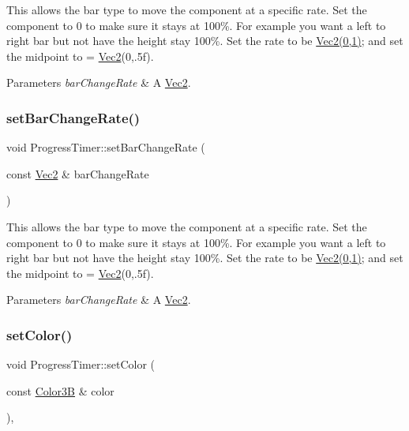 This allows the bar type to move the component at a specific rate. Set the component to 0 to make sure it stays at 100\%. For example you want a left to right bar but not have the height stay 100\%. Set the rate to be \hyperlink{classVec2}{Vec2(0,1)}; and set the midpoint to = \hyperlink{classVec2}{Vec2}(0,.5f). 
\begin{DoxyParams}{Parameters}
{\em bar\+Change\+Rate} & A \hyperlink{classVec2}{Vec2}. \\
\hline
\end{DoxyParams}
\mbox{\label{classProgressTimer_ac54f707a0291274c04e265b2898586d6}} 
\subsubsection{\texorpdfstring{set\+Bar\+Change\+Rate()}{setBarChangeRate()}\hspace{0.1cm}{\footnotesize\ttfamily [2/2]}}
{\footnotesize\ttfamily void Progress\+Timer\+::set\+Bar\+Change\+Rate (\begin{DoxyParamCaption}\item[{const \hyperlink{classVec2}{Vec2} \&}]{bar\+Change\+Rate }\end{DoxyParamCaption})\hspace{0.3cm}{\ttfamily [inline]}}

This allows the bar type to move the component at a specific rate. Set the component to 0 to make sure it stays at 100\%. For example you want a left to right bar but not have the height stay 100\%. Set the rate to be \hyperlink{classVec2}{Vec2(0,1)}; and set the midpoint to = \hyperlink{classVec2}{Vec2}(0,.5f). 
\begin{DoxyParams}{Parameters}
{\em bar\+Change\+Rate} & A \hyperlink{classVec2}{Vec2}. \\
\hline
\end{DoxyParams}
\mbox{\label{classProgressTimer_aabc06a02c225d876ac5746dc6561949f}} 
\subsubsection{\texorpdfstring{set\+Color()}{setColor()}\hspace{0.1cm}{\footnotesize\ttfamily [1/2]}}
{\footnotesize\ttfamily void Progress\+Timer\+::set\+Color (\begin{DoxyParamCaption}\item[{const \hyperlink{structColor3B}{Color3B} \&}]{color }\end{DoxyParamCaption})\hspace{0.3cm}{\ttfamily [override]}, {\ttfamily [virtual]}}

